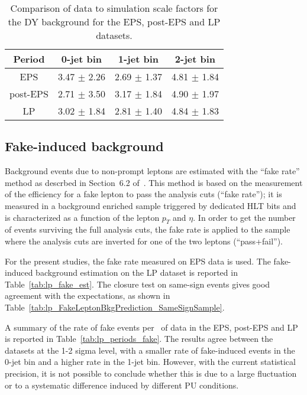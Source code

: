 \begin{table}[!htbp]
\begin{center}
\begin{tabular}{c c c c} 
\hline
Period & 0-jet bin & 1-jet bin & 2-jet bin \\ 
\hline
EPS      & 3.47 $\pm$ 2.26 & 2.69 $\pm$ 1.37 & 4.81 $\pm$ 1.84 \\
post-EPS & 2.71 $\pm$ 3.50 & 3.17 $\pm$ 1.84 & 4.90 $\pm$ 1.97 \\
LP       & 3.02 $\pm$ 1.84 & 2.81 $\pm$ 1.40 & 4.84 $\pm$ 1.83 \\
\hline
\end{tabular}
\caption{Comparison of data to simulation scale factors for the DY background for the EPS, post-EPS and LP datasets.}
\label{tab:lp_periods_dy}
\end{center}
\end{table}

\subsection{Fake-induced background}

Background events due to non-prompt leptons are estimated with the ``fake rate'' method as descrbed in Section~6.2 of~\cite{epsnote}.
This method is based on the measurement of the efficiency for a fake lepton to pass the analysis cuts (``fake rate''); 
it is measured in a background enriched sample triggered by dedicated HLT bits and is characterized as a function of the lepton $p_T$ and $\eta$. 
In order to get the number of events surviving the full analysis cuts, the fake rate is applied to the sample where the analysis cuts are 
inverted for one of the two leptons (``pass+fail'').

For the present studies, the fake rate measured on EPS data is used.
The fake-induced background estimation on the LP dataset is reported in Table~\ref{tab:lp_fake_est}.
The closure test on same-sign events gives good agreement with the expectations, 
as shown in Table~\ref{tab:lp_FakeLeptonBkgPrediction_SameSignSample}.

A summary of the rate of fake events per \ifb~of data in the EPS, post-EPS and LP 
is reported in Table~\ref{tab:lp_periods_fake}.
The results agree between the datasets at the 1-2 sigma level, with a smaller rate of fake-induced events in the 0-jet bin 
and a higher rate in the 1-jet bin. 
However, with the current statistical precision, it is not possible to conclude whether this is due to a large fluctuation or to a systematic 
difference induced by different PU conditions.

